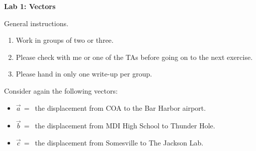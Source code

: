 \documentclass[12pt]{article}
\begin{document}
\pagestyle{empty}

\begin{center}
{\large {\bf Lab 1:  Vectors}}\\
\end{center}

General instructions.
\begin{enumerate}
\setlength{\itemsep}{0mm}
  \item Work in groups of two or three.
  \item Please check with me or one of the TAs before going on to the
    next exercise.
  \item Please hand in only one write-up per group.\\
\end{enumerate}



\noindent Consider again the following vectors:
\begin{itemize}
\setlength{\itemsep}{0mm}
  \item $\vec a \, = \, $ the displacement from COA to the Bar Harbor
  airport.

  \item $\vec b \, = \, $ the displacement from MDI High School to
  Thunder Hole.

  \item $\vec c \, = \, $ the displacement from Somesville to The
  Jackson Lab.

\end{itemize}
\end{document}
